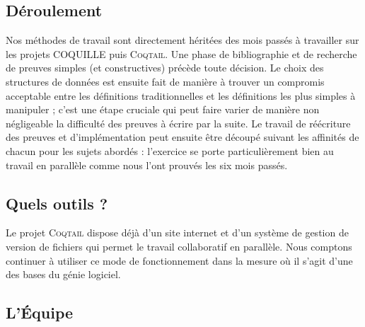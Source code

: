\documentclass[11pt]{article}
\newcommand{\coqtail}{\textsc{Coqtail}}
\newcommand{\coquille}{\textsc{Coquille}}
\begin{document}
\subsection{Déroulement}

Nos méthodes de travail sont directement héritées des mois passés à travailler sur les projets COQUILLE puis \coqtail{}. Une phase de bibliographie et de recherche de preuves simples (et constructives) précède toute décision. Le choix des structures de données est ensuite fait de manière à trouver un compromis acceptable entre les définitions traditionnelles et les définitions les plus simples à manipuler ; c'est une étape cruciale qui peut faire varier de manière non négligeable la difficulté des preuves à écrire par la suite. Le travail de réécriture des preuves et d'implémentation peut ensuite être découpé suivant les affinités de chacun pour les sujets abordés : l'exercice se porte particulièrement bien au travail en parallèle comme nous l'ont prouvés les six mois passés.

\subsection{Quels outils ?}

Le projet \coqtail{} dispose déjà d'un site internet\cite{coqtail} et d'un système de gestion de version de fichiers qui permet le travail collaboratif en parallèle. Nous comptons continuer à utiliser ce mode de fonctionnement dans la mesure où il s'agit d'une des bases du génie logiciel. 





\subsection{L'Équipe}
\end{document}
